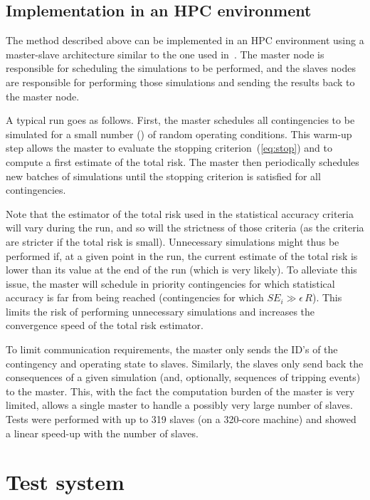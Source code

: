 \subsection{Implementation in an HPC environment}
\label{sec:HPC}

The method described above can be implemented in an HPC environment using a master-slave architecture similar to the one used in~\cite{EurostagHPC}. The master node is responsible for scheduling the simulations to be performed, and the slaves nodes are responsible for performing those simulations and sending the results back to the master node.

A typical run goes as follows. First, the master schedules all contingencies to be simulated for a small number () of random operating conditions. This warm-up step allows the master to evaluate the stopping criterion~(\ref{eq:stop}) and to compute a first estimate of the total risk. The master then periodically schedules new batches of simulations until the stopping criterion is satisfied for all contingencies.

Note that the estimator of the total risk used in the statistical accuracy criteria will vary during the run, and so will the strictness of those criteria (as the criteria are stricter if the total risk is small). Unnecessary simulations might thus be performed if, at a given point in the run, the current estimate of the total risk is lower than its value at the end of the run (which is very likely). To alleviate this issue, the master will schedule in priority contingencies for which statistical accuracy is far from being reached (\ie contingencies for which \(SE_i \gg \epsilon \, R\)). This limits the risk of performing unnecessary simulations and increases the convergence speed of the total risk estimator.

To limit communication requirements, the master only sends the ID's of the contingency and operating state to slaves. Similarly, the slaves only send back the consequences of a given simulation (and, optionally, sequences of tripping events) to the master. This, with the fact the computation burden of the master is very limited, allows a single master to handle a possibly very large number of slaves. Tests were performed with up to 319 slaves (on a 320-core machine) and showed a linear speed-up with the number of slaves.


\section{Test system}
\label{sec:PDSA_test_system}

